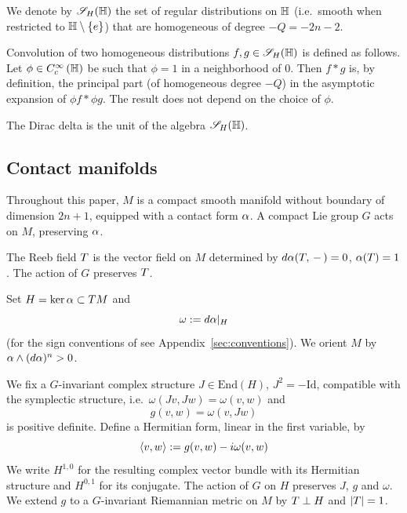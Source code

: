 \documentclass[11pt]{amsart}
\theoremstyle{plain}
\theoremstyle{definition}
\theoremstyle{remark}
\begin{document}

We denote by ${\mathscr{S}_H}(\mathbb{H})$ the set of regular distributions on $\mathbb{H}$ (i.e.\ smooth when restricted to $\mathbb{H}\setminus \{e\}$) that are homogeneous of degree $-Q=-2n-2$.

Convolution of two homogeneous distributions $f,g\in {\mathscr{S}_H}(\mathbb{H})$ is defined as follows.
Let $\phi \in C_c^\infty\left(\mathbb{H}\right)$ be such that $\phi =1 $ in a neighborhood of $0$.
Then $f * g$ is, by definition, the principal part (of homogeneous degree $-Q$) in the asymptotic expansion of $\phi f * \phi g$. The result does not depend on the choice of $\phi$.

The Dirac delta is the unit of the algebra ${\mathscr{S}_H}(\mathbb{H})$.

\subsection{Contact manifolds}\label{sec:contact}

Throughout this paper, $M$ is a compact smooth manifold without boundary of dimension $2n+1$,
equipped with a contact form $\alpha$.
A compact Lie group $G$ acts on $M$, preserving $\alpha$.

The Reeb field $T$ is the vector field on $M$ determined by $d\alpha(T,\,-\,) = 0$, $\alpha(T)=1$. The action of $G$ preserves $T$.

Set $H=\ker\alpha \subset TM$ and
\[\omega:=d\alpha|_H\]
(for the sign conventions of \cite{GvE20,GvE25,GvE26} see Appendix~\ref{sec:conventions}).
We orient $M$ by $\alpha\wedge (d\alpha)^n>0$.

We fix a $G$-invariant complex structure $J\in \mathrm{End}(H)$, $J^2=-\mathrm{Id}$,
compatible with the symplectic structure, i.e.\ $\omega(Jv,Jw) = \omega(v,w)$ and
\begin{equation*}
g(v,w) = \omega(v, Jw)
\end{equation*}
is positive definite.
Define a Hermitian form, linear in the first variable, by
\begin{equation*}
\langle v,w \rangle:= g(v,w)-i\omega(v,w)
\end{equation*}
We write $H^{1,0}$ for the resulting complex vector bundle with its Hermitian structure and $H^{0,1}$ for its conjugate.
The action of $G$ on $H$ preserves $J$, $g$ and $\omega$.
We extend $g$ to a $G$-invariant Riemannian metric on $M$ by $T\perp H$ and $|T|=1$.
\end{document}
